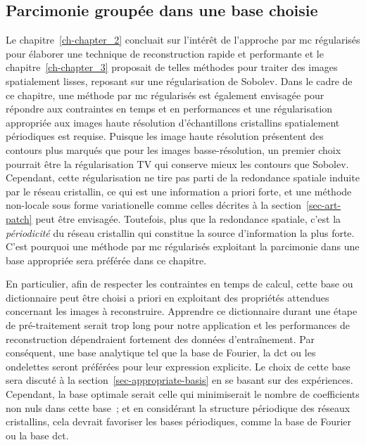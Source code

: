 \subsection{Parcimonie groupée dans une base choisie}

Le chapitre~\ref{ch-chapter_2} concluait sur l'intérêt de l'approche par \gls{mc} régularisés pour élaborer une technique de reconstruction rapide et performante et le chapitre~\ref{ch-chapter_3} proposait de telles méthodes pour traiter des images spatialement lisses, reposant sur une régularisation de Sobolev. 
%
Dans le cadre de ce chapitre, une méthode par \gls{mc} régularisés est également envisagée pour répondre aux contraintes en temps et en performances et une régularisation appropriée aux images haute résolution d'échantillons cristallins spatialement périodiques est requise.
%
Puisque les image haute résolution présentent des contours plus marqués que pour les images basse-résolution, un premier choix pourrait être la régularisation TV qui conserve mieux les contours que Sobolev. Cependant, cette régularisation ne tire pas parti de la redondance spatiale induite par le réseau cristallin, ce qui est une information a priori forte, et une méthode non-locale sous forme variationelle comme celles décrites à la section~\ref{sec-art-patch} peut être envisagée. Toutefois, plus que la redondance spatiale, c'est la \emph{périodicité} du réseau cristallin qui constitue la source d'information la plus forte. C'est pourquoi une méthode par \gls{mc} régularisés exploitant la parcimonie dans une base appropriée sera préférée dans ce chapitre. 

En particulier, afin de respecter les contraintes en temps de calcul, cette base ou dictionnaire peut être choisi a priori en exploitant des propriétés attendues concernant les images à reconstruire. Apprendre ce dictionnaire durant une étape de pré-traitement serait trop long pour notre application et les performances de reconstruction dépendraient fortement des données d'entraînement. Par conséquent, une base analytique tel que la base de Fourier, la \gls{dct} ou les ondelettes seront préférées pour leur expression explicite. Le choix de cette base sera discuté à la section~\ref{sec-appropriate-basis} en se basant sur des expériences.
%
Cependant, la base optimale serait celle qui minimiserait le nombre de coefficients non nuls dans cette base~; et en considérant la structure périodique des réseaux cristallins, cela devrait favoriser les bases périodiques, comme la base de Fourier ou la base \gls{dct}. 

